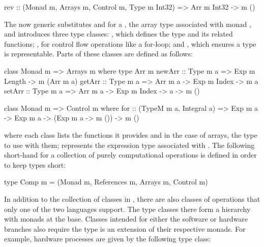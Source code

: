 \documentclass[../paper.tex]{subfiles}
\begin{document}
\begin{code}
rev :: (Monad m, Arrays m, Control m, Type m Int32) => Arr m Int32 -> m ()
\end{code}

\noindent The now generic  substitutes  and  for a , the array type associated with monad , and introduces three type classes: , which defines the  type and its related functions; , for control flow operations like a for-loop; and , which ensures a type is representable. Parts of these classes are defined as follows:

\begin{code}
class Monad m => Arrays m where
  type Arr m
  newArr :: Type m a => Exp m Length -> m (Arr m a)
  getArr :: Type m a => Arr m a -> Exp m Index -> m a
  setArr :: Type m a => Arr m a -> Exp m Index -> a -> m ()

class Monad m => Control m where
  for :: (TypeM m a, Integral a) => Exp m a -> Exp m a -> (Exp m a -> m ())
      -> m ()
\end{code}

\noindent where each class lists the functions it provides and in the case of arrays, the type to use with them;  represents the expression type associated with . The following short-hand for a collection of purely computational operations is defined in order to keep types short:

\begin{code}
type Comp m = (Monad m, References m, Arrays m, Control m)
\end{code}

In addition to the collection of classes in , there are also classes of operations that only one of the two languages support. The type classes there form a hierarchy with monads at the base. Classes intended for either the software or hardware branches also require the type is an extension of their respective monads. For example, hardware processes are given by the following type class:

\end{document}
